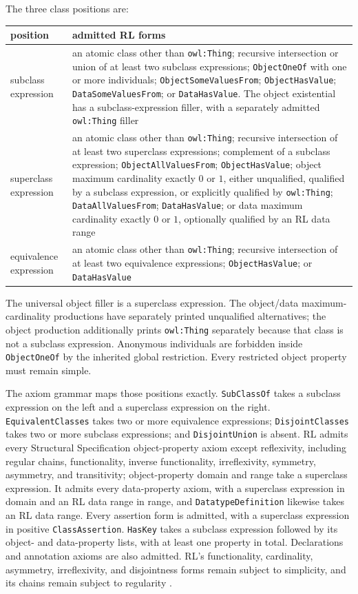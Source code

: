 The three class positions are:
\begin{center}
\small
\begin{tabularx}{\textwidth}{@{}l X@{}}
\toprule
position & admitted RL forms\\
\midrule
subclass expression &
an atomic class other than \texttt{owl:Thing}; recursive intersection or union
of at least two subclass expressions; \texttt{ObjectOneOf} with one or more
individuals; \texttt{ObjectSomeValuesFrom};
\texttt{ObjectHasValue}; \texttt{DataSomeValuesFrom}; or
\texttt{DataHasValue}.  The object existential has a subclass-expression
filler, with a separately admitted \texttt{owl:Thing} filler\\
superclass expression &
an atomic class other than \texttt{owl:Thing}; recursive intersection of at
least two superclass expressions;
complement of a subclass expression; \texttt{ObjectAllValuesFrom};
\texttt{ObjectHasValue}; object maximum cardinality exactly \(0\) or \(1\),
either unqualified, qualified by a subclass expression, or explicitly qualified
by \texttt{owl:Thing}; \texttt{DataAllValuesFrom};
\texttt{DataHasValue}; or data maximum cardinality exactly \(0\) or \(1\),
optionally qualified by an RL data range\\
equivalence expression &
an atomic class other than \texttt{owl:Thing}; recursive intersection of at
least two equivalence expressions;
\texttt{ObjectHasValue}; or \texttt{DataHasValue}\\
\bottomrule
\end{tabularx}
\end{center}
The universal object filler is a superclass expression.  The object/data
maximum-cardinality productions have separately printed unqualified
alternatives; the object production additionally prints \texttt{owl:Thing}
separately because that class is not a subclass expression.  Anonymous
individuals are forbidden inside \texttt{ObjectOneOf} by the inherited global
restriction.  Every restricted object property must remain simple.

The axiom grammar maps those positions exactly.  \texttt{SubClassOf} takes a
subclass expression on the left and a superclass expression on the right.
\texttt{EquivalentClasses} takes two or more equivalence expressions;
\texttt{DisjointClasses} takes two or more subclass expressions; and
\texttt{DisjointUnion} is absent.  RL admits every Structural Specification
object-property axiom except reflexivity, including regular chains,
functionality, inverse functionality, irreflexivity, symmetry, asymmetry, and
transitivity; object-property domain and range take a superclass expression.
It admits every data-property axiom, with a superclass expression in domain and
an RL data range in range, and \texttt{DatatypeDefinition} likewise takes an RL
data range.  Every assertion form is admitted, with a superclass expression in
positive \texttt{ClassAssertion}.  \texttt{HasKey} takes a subclass expression
followed by its object- and data-property lists, with at least one property in
total.  Declarations and annotation axioms are also admitted.  RL's
functionality, cardinality, asymmetry, irreflexivity, and disjointness forms
remain subject to simplicity, and its chains remain subject to regularity
\cite[\S4.2 and app.~6.3]{W3COWL2Profiles2012}.

